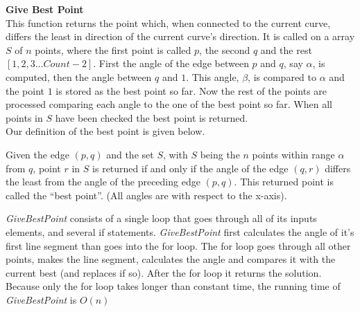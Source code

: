   \noindent\textbf{Give Best Point}\\
     This function returns the point which, when connected to the current curve, differs the least in direction of the current curve's direction. It is called on a array $S$ of $n$ points, where the first point is called $p$, the second $q$ and the rest $[1,2,3 \ldots Count-2]$. First the angle of the edge between $p$ and $q$, say $\alpha$, is computed, then the angle between $q$ and $1$. This angle, $\beta$, is compared to $\alpha$ and the point $1$ is stored as the best point so far. Now the rest of the points are processed comparing each angle to the one of the best point so far. When all points in $S$ have been checked the best point is returned.\\
     Our definition of the best point is given below.\\
      \begin{definition} \label{def:gbp}
          Given the edge $(p,q)$ and the set $S$, with $S$ being the $n$ points within range $\alpha$ from $q$, point $r$ in $S$ is returned if and only if the angle of the edge $(q,r)$ differs the least from the angle of the preceding edge $(p,q)$. This returned point is called the ``best point''. (All angles are with respect to the x-axis).
      \end{definition}
      \noindent \emph{GiveBestPoint} consists of a single loop that goes through all of its inputs elements, and several if statements. \textit{GiveBestPoint} first calculates the angle of it's first line segment than goes into the for loop. The for loop goes through all other points, makes the line segment, calculates the angle and compares it with the current best (and replaces if so). After the for loop it returns the solution.\\
      Because only the for loop takes longer than constant time, the running time of \textit{GiveBestPoint} is $O(n)$\\


